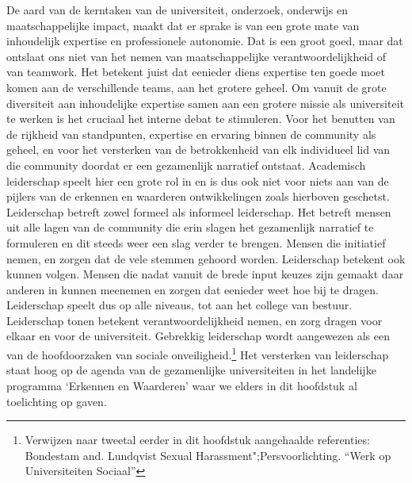\documentclass{jote-book}
\begin{document}
	De aard van de kerntaken van de universiteit, onderzoek, onderwijs en maatschappelijke impact, maakt dat er sprake is van een grote mate van inhoudelijk expertise en professionele autonomie. Dat is een groot goed, maar dat ontslaat ons niet van het nemen van maatschappelijke verantwoordelijkheid of van teamwork. Het betekent juist dat eenieder diens expertise ten goede moet komen aan de verschillende teams, aan het grotere geheel. Om vanuit de grote diversiteit aan inhoudelijke expertise samen aan een grotere missie als universiteit te werken is het cruciaal het interne debat te stimuleren. Voor het benutten van de rijkheid van standpunten, expertise en ervaring binnen de community als geheel, en voor het versterken van de betrokkenheid van elk individueel lid van die community doordat er een gezamenlijk narratief ontstaat. Academisch leiderschap speelt hier een grote rol in en is dus ook niet voor niets aan van de pijlers van de erkennen en waarderen ontwikkelingen zoals hierboven geschetst. Leiderschap betreft zowel formeel als informeel leiderschap. Het betreft mensen uit alle lagen van de community die erin slagen het gezamenlijk narratief te formuleren en dit steeds weer een slag verder te brengen. Mensen die initiatief nemen, en zorgen dat de vele stemmen gehoord worden. Leiderschap betekent ook kunnen volgen. Mensen die nadat vanuit de brede input keuzes zijn gemaakt daar anderen in kunnen meenemen en zorgen dat eenieder weet hoe bij te dragen. Leiderschap speelt dus op alle niveaus, tot aan het college van bestuur. Leiderschap tonen betekent verantwoordelijkheid nemen, en zorg dragen voor elkaar en voor de universiteit. Gebrekkig leiderschap wordt aangewezen als een van de hoofdoorzaken van sociale onveiligheid.\footnote{Verwijzen naar tweetal eerder in dit hoofdstuk aangehaalde referenties: Bondestam and. Lundqvist Sexual Harassment";Persvoorlichting. “Werk op Universiteiten Sociaal” } Het versterken van leiderschap staat hoog op de agenda van de gezamenlijke universiteiten in het landelijke programma ‘Erkennen en Waarderen' waar we elders in dit hoofdstuk al toelichting op gaven.
\end{document}

